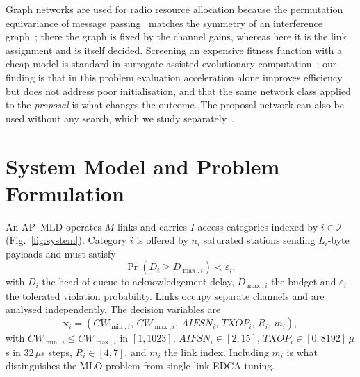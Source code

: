 \documentclass[journal,a4paper,comsoc,twocolumn]{IEEEtran}
\begin{document}
Graph networks are used for radio resource allocation because the permutation
equivariance of message passing~\cite{Gilmer2017} matches the symmetry of an
interference graph~\cite{Shen2021,Eisen2020,Sun2018}; there the graph is fixed
by the channel gains, whereas here it is the link assignment and is itself
decided. Screening an expensive fitness function with a cheap model is standard
in surrogate-assisted evolutionary computation~\cite{Jin2011}; our finding is
that in this problem evaluation acceleration alone improves efficiency but does
not address poor initialisation, and that the same network class applied to the
\emph{proposal} is what changes the outcome. The proposal
network can also be used without any search, which we study
separately~\cite{Companion}.

\section{System Model and Problem Formulation}
\label{sec:system}

An AP~MLD operates $M$ links and carries $I$ access categories indexed by
$i \in \mathcal{I}$ (Fig.~\ref{fig:system}). Category $i$ is offered by $n_i$
saturated stations sending $L_i$-byte payloads and must satisfy
\begin{equation}
\label{eq:qos}
\Pr(D_i \ge D_{\max,i}) < \varepsilon_i ,
\end{equation}
with $D_i$ the head-of-queue-to-acknowledgement delay, $D_{\max,i}$ the budget
and $\varepsilon_i$ the tolerated violation probability. Links occupy separate
channels and are analysed independently. The decision variables are
\begin{equation}
\label{eq:decision}
\mathbf{x}_i = (CW_{\min,i},\, CW_{\max,i},\, AIFSN_i,\, TXOP_i,\, R_i,\, m_i),
\end{equation}
with $CW_{\min,i} \le CW_{\max,i}$ in $[1,1023]$, $AIFSN_i \in [2,15]$,
$TXOP_i \in [0,8192]\,\mu$s in $32\,\mu$s steps, $R_i \in [4,7]$, and $m_i$ the
link index. Including $m_i$ is what distinguishes the MLO problem from
single-link EDCA tuning.
\end{document}
